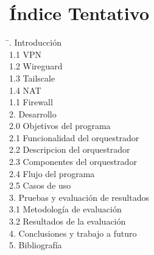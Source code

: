 \documentclass[letterpaper,12pt,oneside]{book}
\begin{document}
\section{Índice Tentativo}
\begin{flushleft}
    \begin{tabbing}
    \hspace{4cm} \= . Introducción \> \dotfill  \\
    \hspace{0.5cm}1.1 VPN \> \dotfill  \\
    \hspace{0.5cm}1.2 Wireguard \> \dotfill  \\
    \hspace{0.5cm}1.3 Tailscale \> \dotfill  \\
    \hspace{0.5cm}1.4 NAT \> \dotfill  \\
    \hspace{0.5cm}1.1 Firewall \> \dotfill  \\

    2. Desarrollo \> \dotfill  \\

    \hspace{0.5cm}2.0 Objetivos del programa \> \dotfill  \\
    \hspace{0.5cm}2.1 Funcionalidad del orquestrador \> \dotfill  \\
    \hspace{0.5cm}2.2 Descripcion del orquestrador \> \dotfill  \\
    \hspace{0.5cm}2.3 Componentes del orquestrador \> \dotfill  \\
    \hspace{0.5cm}2.4 Flujo del programa \> \dotfill  \\
    \hspace{0.5cm}2.5 Casos de uso \> \dotfill  \\
    
    3. Pruebas y evaluación de resultados \> \dotfill \\
    \hspace{0.5cm}3.1 Metodología de evaluación \> \dotfill \\
    \hspace{0.5cm}3.2 Resultados de la evaluación \> \dotfill \\
    4. Conclusiones y trabajo a futuro \> \dotfill  \\
    5. Bibliografía \> \dotfill \\
    \end{tabbing}
    \end{flushleft}
\end{document}
